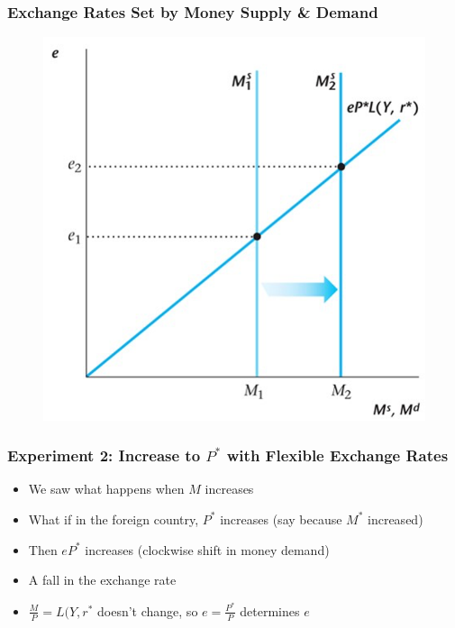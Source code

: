\documentclass{beamer}
\begin{document}
\begin{frame}
\frametitle[alignment=center]{Exchange Rates Set by Money Supply \& Demand}
\begin{figure}
\centering
\includegraphics[scale=0.75]{Figures/W_Fig_17pt4.png}
\end{figure}
\end{frame}


\begin{frame}
\frametitle[alignment=center]{Experiment 2: Increase to $P^*$ with Flexible Exchange Rates}
\begin{itemize}
\item We saw what happens when $M$ increases
\bigskip
\item What if in the foreign country, $P^*$ increases (say because $M^*$ increased)
\bigskip
\item Then $eP^*$ increases (clockwise shift in money demand)
\bigskip
\item A fall in the exchange rate
\bigskip
\item $\frac{M}{P}=L(Y,r^*$ doesn't change, so $e=\frac{P^*}{P}$ determines $e$
\end{itemize}
\end{frame}
\end{document}
